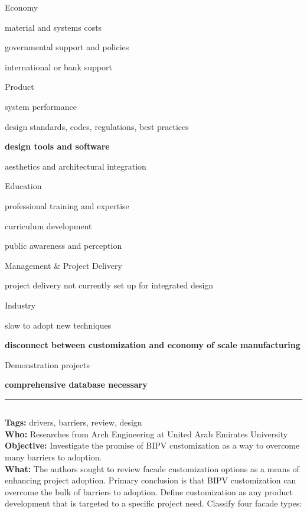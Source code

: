\documentclass[11pt,a4paper]{article}
\newenvironment{itemize*}%
  {\begin{itemize}[rightmargin=\dimexpr\linewidth-120mm-\leftmargin\relax]%
    \setlength{\itemsep}{0pt}%
    \setlength{\parskip}{0pt}}%
  {\end{itemize}}
\begin{document}
Economy 
\begin{itemize*}
    \item material and systems costs
    \item governmental support and policies
    \item international or bank support
\end{itemize*}

Product 
\begin{itemize*}
    \item system performance
    \item design standards, codes, regulations, best practices
    \item \textbf{design tools and software}
    \item aesthetics and architectural integration
\end{itemize*}

Education 
\begin{itemize*}
    \item professional training and expertise
    \item curriculum development
    \item public awareness and perception
\end{itemize*}

Management \& Project Delivery
\begin{itemize*}
    \item project delivery not currently set up for integrated design
\end{itemize*}

Industry 
\begin{itemize*}
    \item slow to adopt new techniques
    \item \textbf{disconnect between customization and economy of scale manufacturing}
\end{itemize*}

Demonstration projects 
\begin{itemize*}
    \item \textbf{comprehensive database necessary}
\end{itemize*}

\noindent\rule{\textwidth}{1pt}
\subsection*{}
\textbf{Tags:} drivers, barriers, review, design \\
\textbf{Who:} Researches from Arch Engineering at United Arab Emirates University \\
\textbf{Objective:}  Investigate the promise of BIPV customization as a way to overcome many barriers to adoption. \\
\textbf{What:} The authors sought to review facade customization options as a means of enhancing project adoption. Primary conclusion is that BIPV customization can overcome the bulk of barriers to adoption. Define customization as any product development that is targeted to a specific project need. Classify four facade types:
\end{document}
